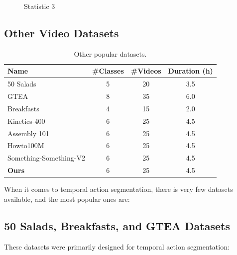 \begin{figure}[H]
\begin{minipage}{0.245\textwidth}
        \caption{Statistic 3}
        \label{fig:example3}
    \end{minipage}%
\end{figure}


\subsection{Other Video Datasets}


\begin{table}[h!]
    \centering
    \begin{tabular}{|l|c|c|c|}
        \hline
        \textbf{Name} & \textbf{\#Classes} & \textbf{\#Videos} & \textbf{Duration (h)} \\ \hline
        50 Salads & 5 & 20 & 3.5 \\ \hline
        GTEA & 8 & 35 & 6.0 \\ \hline
        Breakfasts & 4 & 15 & 2.0 \\ \hline
        Kinetics-400 & 6 & 25 & 4.5 \\ \hline
        Assembly 101 & 6 & 25 & 4.5 \\ \hline
        Howto100M & 6 & 25 & 4.5 \\ \hline
        Something-Something-V2 & 6 & 25 & 4.5 \\ \hline
        \textbf{Ours} & 6 & 25 & 4.5 \\ \hline
    \end{tabular}
    \caption{Other popular datasets.}
    \label{tab:dataset_stats}
\end{table}

When it comes to temporal action segmentation, there is very few datasets available, and the most popular ones are:

\subsection*{50 Salads, Breakfasts, and GTEA Datasets}
These datasets were primarily designed for temporal action segmentation:

